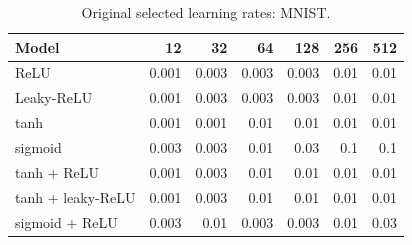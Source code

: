 \begin{table}[htbp]
\centering
\caption{Original selected learning rates: MNIST.}
\label{tab:lrs:mnist}
\footnotesize
\begin{tabular}{@{}lrrrrrr@{}}
\toprule
Model & 12 & 32 & 64 & 128 & 256 & 512 \\
\midrule
ReLU & 0.001 & 0.003 & 0.003 & 0.003 & 0.01 & 0.01 \\
Leaky-ReLU & 0.001 & 0.003 & 0.003 & 0.003 & 0.01 & 0.01 \\
tanh & 0.001 & 0.001 & 0.01 & 0.01 & 0.01 & 0.01 \\
sigmoid & 0.003 & 0.003 & 0.01 & 0.03 & 0.1 & 0.1 \\
tanh + ReLU & 0.001 & 0.003 & 0.01 & 0.01 & 0.01 & 0.01 \\
tanh + leaky-ReLU & 0.001 & 0.003 & 0.01 & 0.01 & 0.01 & 0.01 \\
sigmoid + ReLU & 0.003 & 0.01 & 0.003 & 0.003 & 0.01 & 0.03 \\
\bottomrule
\end{tabular}
\end{table}
